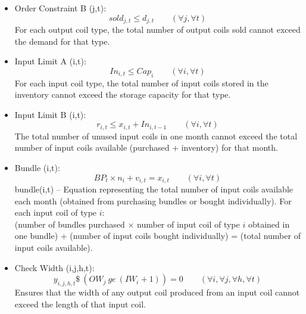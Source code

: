 \documentclass{article}[12pt]
\begin{document}
\begin{itemize}
\item Order Constraint B (j,t): \\
\begin{displaymath}
sold_{j,t} \leq d_{j,t} \qquad (\forall j, \forall t)
\end{displaymath}
For each output coil type, the total number of output coils sold cannot exceed the demand for that type. \\

\item Input Limit A (i,t): \\
\begin{displaymath}
In_{i,t} \leq Cap_{i} \qquad (\forall i, \forall t)
\end{displaymath}
For each input coil type, the total number of input coils stored in the inventory cannot exceed the storage capacity for that type. \\

\item Input Limit B (i,t): \\
\begin{displaymath}
r_{i,t} \leq x_{i,t} + In_{i,t-1} \qquad (\forall i, \forall t)
\end{displaymath}
The total number of unused input coils in one month cannot exceed the total number of input coils available (purchased + inventory) for that month. \\

\item Bundle (i,t): \\
\begin{displaymath}
BP_{t} \times n_{i} + v_{i,t} = x_{i,t} \qquad (\forall i, \forall t)
\end{displaymath}
bundle(i,t) -- Equation representing the total number of input coils available each month (obtained from purchasing bundles or bought individually). For each input coil of type $i$:\\ (number of bundles purchased $\times$ number of input coil of type $i$ obtained in one bundle) + (number of input coils bought individually) = (total number of input coils available). \\

\item Check Width (i,j,h,t): \\
\begin{displaymath}
y_{i,j,h,t}\$\ (OW_{j}\ ge\ (IW_{i} + 1)) = 0 \qquad (\forall i, \forall j, \forall h, \forall t)
\end{displaymath}
Ensures that the width of any output coil produced from an input coil cannot exceed the length of that input coil. \\


\end{itemize}
\end{document}
